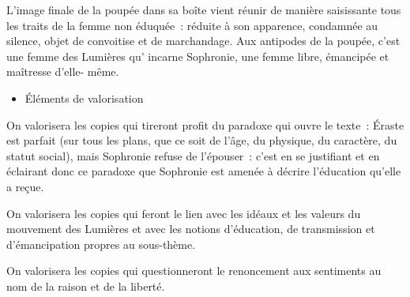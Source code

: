 {L'image finale de la poupée dans sa boîte vient réunir de manière saisissante tous les
traits de la femme non éduquée~: réduite à son apparence, condamnée au silence,
objet de convoitise et de marchandage. Aux antipodes de la poupée, c'est une femme
des Lumières qu' incarne Sophronie, une femme libre, émancipée et maîtresse d'elle-
même.

\begin{itemize}[label=\textbullet]
\item Éléments de valorisation
\end{itemize}

On valorisera les copies qui tireront profit du paradoxe qui ouvre le texte~: Éraste est
parfait (sur tous les plans, que ce soit de l'âge, du physique, du caractère, du statut
social), mais Sophronie refuse de l'épouser~: c'est en se justifiant et en éclairant donc
ce paradoxe que Sophronie est amenée à décrire l'éducation qu'elle a reçue.

On valorisera les copies qui feront le lien avec les idéaux et les valeurs du mouvement
des Lumières et avec les notions d'éducation, de transmission et d'émancipation
propres au sous-thème.

On valorisera les copies qui questionneront le renoncement aux sentiments au nom
de la raison et de la liberté.}%
